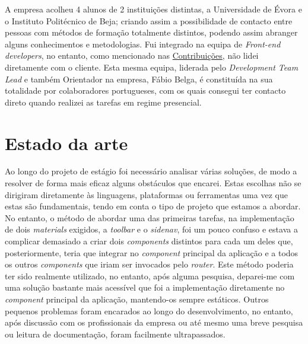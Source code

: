 \documentclass{article}
\begin{document}
\hspace*{0.5cm} A empresa acolheu 4 alunos de 2 instituições distintas, a Universidade de Évora e o Instituto Politécnico de Beja; criando assim a possibilidade de contacto entre pessoas com métodos de formação totalmente distintos, podendo assim abranger alguns conhecimentos e metodologias. Fui integrado na equipa de \emph{Front-end developers}, no entanto, como mencionado nas \hyperref[sec:cont]{Contribuições}, não lidei diretamente com o cliente. Esta mesma equipa, liderada pelo \emph{Development Team Lead} e também Orientador na empresa, Fábio Belga, é constituída na sua totalidade por colaboradores portugueses, com os quais consegui ter contacto direto quando realizei as tarefas em regime presencial. \newline

\cleardoublepage
\section{Estado da arte}
\label{sec:est-art}
\hspace*{0.5cm} Ao longo do projeto de estágio foi necessário analisar várias soluções, de modo a resolver de forma mais eficaz alguns obstáculos que encarei. Estas escolhas não se dirigiram diretamente às linguagens, plataformas ou ferramentas uma vez que estas são fundamentais, tendo em conta o tipo de projeto que estamos a abordar. \newline
\hspace*{0.5cm} No entanto, o método de abordar uma das primeiras tarefas, na implementação de dois \emph{materials} exigidos, a \emph{toolbar} e o \emph{sidenav}, foi um pouco confuso e estava a complicar demasiado a criar dois \emph{components} distintos para cada um deles que, posteriormente, teria que integrar no \emph{component} principal da aplicação e a todos os outros \emph{components} que iriam ser invocados pelo \emph{router}. Este método poderia ter sido realmente utilizado, no entanto, após alguma pesquisa, deparei-me com uma solução bastante mais acessível que foi a implementação diretamente no \emph{component} principal da aplicação, mantendo-os sempre estáticos. \newline
\hspace*{0.5cm} Outros pequenos problemas foram encarados ao longo do desenvolvimento, no entanto, após discussão com os profissionais da empresa ou até mesmo uma breve pesquisa ou leitura de documentação, foram facilmente ultrapassados.
\end{document}
